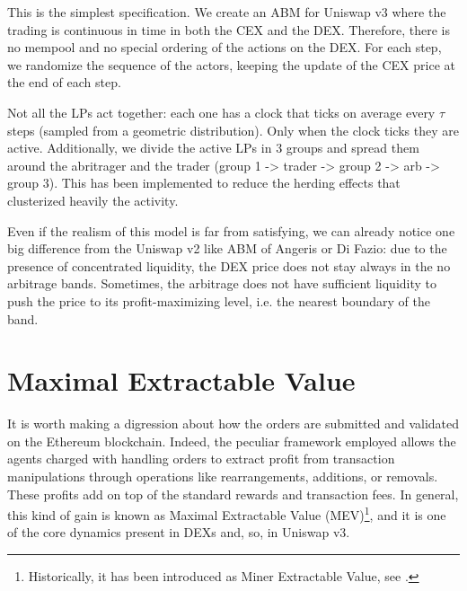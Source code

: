 \documentclass[a4paper,11pt]{article}
\begin{document}
This is the simplest specification. We create an ABM for Uniswap v3 where the trading is continuous in time in both the CEX and the DEX. Therefore, there is no mempool and no special ordering of the actions on the DEX. For each step, we randomize the sequence of the actors, keeping the update of the CEX price at the end of each step.


Not all the LPs act together: each one has a clock that ticks on average every $\tau$ steps (sampled from a geometric distribution). Only when the clock ticks they are active. Additionally, we divide the active LPs in 3 groups and spread them around the abritrager and the trader (group 1 -> trader -> group 2 -> arb -> group 3). This has been implemented to reduce the herding effects that clusterized heavily the activity.


Even if the realism of this model is far from satisfying, we can already notice one big difference from the Uniswap v2 like ABM of Angeris or Di Fazio: due to the presence of concentrated liquidity, the DEX price does not stay always in the no arbitrage bands. Sometimes, the arbitrage does not have sufficient liquidity to push the price to its profit-maximizing level, i.e. the nearest boundary of the band.

\section{Maximal Extractable Value}
\label{sec:mev}

It is worth making a digression about how the orders are submitted and validated on the Ethereum blockchain. Indeed, the peculiar framework employed allows the agents charged with handling orders to extract profit from transaction manipulations through operations like rearrangements, additions, or removals. These profits add on top of the standard rewards and transaction fees. In general, this kind of gain is known as Maximal Extractable Value (MEV)\footnote{Historically, it has been introduced as Miner Extractable Value, see \cite{daian2019flash}.}, and it is one of the core dynamics present in DEXs and, so, in Uniswap v3. \\
\end{document}
